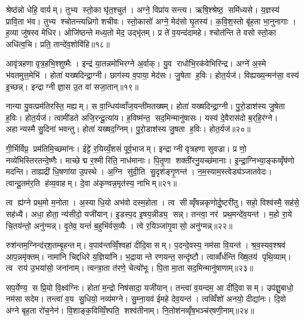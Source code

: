 श्रेष्ठ॑न्नो धेहि॒ वार्यम्। तुभ्य स्तो॒का घृ॑त॒श्चुत॑। अग्ने॒ विप्रा॑य सन्त्य। ऋषि॒श्श्रेष्ठ॒ समि॑ध्यसे। य॒ज्ञस्य॑ प्रावि॒ता भ॑व। तुभ्य श्चोतन्त्यध्रिगो शचीवः। स्तो॒कासो॑ अग्ने॒ मेद॑सो घृ॒तस्य॑। क॒वि॒श॒स्तो बृ॑ह॒ता भा॒नुनागाः। ह॒व्या जु॑षस्व मेधिर। ओजि॑ष्ठन्ते मध्य॒तो मेद॒ उद्भृ॑तम्। प्र ते॑ व॒यन्द॑दामहे। श्चोत॑न्ति ते वसो स्तो॒का अधि॑त्व॒चि। प्रति॒ तान्दे॑व॒शोवि॑हि॥१८॥\anuvakamend[दे॒ववी॑तय॒ उद्भृ॑त॒न्त्रीणि॑ च]

आवृ॑त्रहणा वृत्र॒हभि॒श्शुष्मैः। इन्द्र॑ या॒तन्नमो॑भिरग्ने अ॒र्वाक्। यु॒व राधो॑भि॒रक॑वेभिरिन्द्र। अग्ने॑ अ॒स्मे भ॑वतमुत्त॒मेभि॑। होता॑ यख्षदिन्द्रा॒ग्नी। छाग॑स्य व॒पाया॒ मेद॑सः। जु॒षेता ह॒विः। होत॒र्यज॑। विह्यख्य॒न्मन॑सा॒ वस्य॑ इ॒च्छन्न्। इन्द्राग्नी ज्ञा॒स उ॒त वा॑ सजा॒तान्॥१९॥

नान्या यु॒वत्प्रम॑तिरस्ति॒ मह्यम्। स वा॒न्धिय॑व्वाँज॒यन्ती॑मतख्षम्। होता॑ यख्षदिन्द्रा॒ग्नी। पु॒रो॒डाश॑स्य जु॒षेता ह॒विः। होत॒र्यज॑। त्वामी॑डते अजि॒रन्दू॒त्या॑य। ह॒विष्म॑न्त॒ सद॒मिन्मानु॑षासः। यस्य॑ दे॒वैरास॑दो ब॒र्‌हि॒र॑ग्ने। अहान्यस्मै सु॒दिना॑ भवन्तु। होता॑ यख्षद॒ग्निम्। पु॒रो॒डाश॑स्य जु॒षता ह॒विः। होत॒र्यज॑॥२०॥\anuvakamend[स॒जा॒तान॒ग्निन्द्वे च॑]

गी॒र्भिर्विप्र॒ प्रम॑तिमि॒च्छमा॑नः। ईट्टे॑ र॒यिय्यँ॒शसं॑ पूर्व॒भाजम्। इन्द्राग्नी वृत्रहणा सुवज्रा। प्र णो॒ नव्ये॑भिस्तिरतन्दे॒ष्णैः। माच्छेद्म र॒श्मीरिति॒ नाध॑मानाः। पि॒तृ॒णा शक्ती॑रनु॒यच्छ॑मानाः। इ॒न्द्रा॒ग्निभ्या॒ङ्कव्वृँष॑णो मदन्ति। ताह्यद्री॑ धि॒षणा॑या उ॒पस्थे। अ॒ग्नि सु॑दी॒ति सु॒दृश॑ङ्गृ॒णन्त॑। न॒म॒स्याम॒स्त्वेड्य॑ञ्जातवेदः। त्वान्दू॒तम॑र॒ति ह॑व्य॒वाहम्। दे॒वा अ॑कृण्वन्न॒मृत॑स्य॒ नाभिम्॥२१॥\anuvakamend[जा॒त॒वे॒दो॒ द्वे च॑]

त्व ह्य॑ग्ने प्रथ॒मो म॒नोता। अ॒स्या धि॒यो अभ॑वो दस्म॒होता। त्व सीव्वृँषन्नकृणोर्दु॒ष्टरी॑तु। सहो॒ विश्व॑स्मै॒ सह॑से॒ सह॑ध्यै। अधा॒ होता॒ न्य॑सीदो॒ यजी॑यान्। इ॒डस्प॒द इ॒षय॒न्नीड्य॒ सन्न्। तन्त्वा॒ नर॑ प्रथ॒मन्दे॑व॒यन्त॑। म॒हो रा॒ये चि॒तय॑न्तो॒ अनु॑ग्मन्न्। वृ॒तेव॒ यन्तं॑ ब॒हुभि॑र्वस॒व्यैः। त्वे र॒यिञ्जा॑गृ॒वासो॒ अनु॑ग्मन्न्॥२२॥

रुश॑न्तम॒ग्निन्द॑र्‌श॒तम्बृ॒हन्तम्। व॒पाव॑न्तव्विँ॒श्वहा॑ दीदि॒वासम्। प॒दन्दे॒वस्य॒ नम॑सा वि॒यन्त॑। श्र॒व॒स्यव॒श्श्रव॑ आप॒न्नमृ॑क्तम्। नामा॑नि चिद्दधिरे य॒ज्ञिया॑नि। भ॒द्रायान्ते रणयन्त॒ सन्दृ॑ष्टौ। त्वाव्वँ॑र्धन्ति ख्षि॒तय॑ पृथि॒व्याम्। त्व राय॑ उ॒भया॑सो॒ जना॑नाम्। त्वन्त्रा॒ता त॑रणे॒ चेत्यो॑भूः। पि॒ता मा॒ता सद॒मिन्मानु॑षाणाम्॥२३॥

सप॒र्येण्य॒ स प्रि॒यो वि॒क्ष्व॑ग्निः। होता॑ म॒न्द्रो निष॑सादा॒ यजी॑यान्। तन्त्वा॑ व॒यन्दम॒ आ दी॑दि॒वासम्। उप॑ज्ञु॒बाधो॒ नम॑सा सदेम। तन्त्वा॑ व॒य सु॒धियो॒ नव्य॑मग्ने। सु॒म्ना॒यव॑ ईमहे देव॒यन्त॑। त्वव्विँशो॑ अनयो॒ दीद्या॑नः। दि॒वो अ॑ग्ने बृह॒ता रो॑च॒नेन॑। वि॒शाङ्क॒विव्विँ॒श्पति॒ शश्व॑तीनाम्। नि॒तोश॑नव्वृँष॒भञ्च॑र्‌षणी॒नाम्॥२४॥

